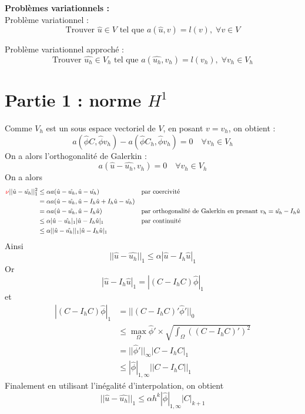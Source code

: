 \documentclass[french]{article}
\begin{document}
	\textbf{Problèmes variationnels :} \\
	
	Problème variationnel :
	$$\text{Trouver } \hat{u}\in V \text{ tel que } a(\hat{u},v)=l(v), \;\forall v\in V$$
	
	Problème variationnel approché :
	$$\text{Trouver } \hat{u_h}\in V_h \text{ tel que } a(\hat{u_h},v_h)=l(v_h), \;\forall v_h\in V_h$$
	
	\section{Partie 1 : norme $H^1$}
	
	Comme $V_h$ est un sous espace vectoriel de $V$, en posant $v=v_h$, on obtient :
	$$a(\hat{\phi}C,\hat{\phi}v_h)-a(\hat{\phi}C_h,\hat{\phi}v_h)=0 \quad \forall v_h\in V_h$$
	On a alors l'orthogonalité de Galerkin : \color{red}{(ATTENTION : Abus de notation sur $v_h$ !)}\color{black}
	$$a(\hat{u}-\hat{u_h},v_h)=0 \quad \forall v_h\in V_h$$
	On a alors
	\begin{align*}
		\color{red}{\nu}\color{black}||\hat{u}-\hat{u_h}||_1^2&\le\alpha a(\hat{u}-\hat{u_h},\hat{u}-\hat{u_h}) &&\text{par coercivité} \\
		&=\alpha a(\hat{u}-\hat{u_h},\hat{u}-I_h\hat{u}+I_h\hat{u}-\hat{u_h}) \\
		&=\alpha a(\hat{u}-\hat{u_h},\hat{u}-I_h\hat{u}) &&\text{par orthogonalité de Galerkin en prenant } v_h=\hat{u_h}-I_h\hat{u} \\
		&\le\alpha |\hat{u}-\hat{u_h}|_1|\hat{u}-I_h\hat{u}|_1 &&\text{par continuité} \\
		&\le\alpha ||\hat{u}-\hat{u_h}||_1|\hat{u}-I_h\hat{u}|_1
	\end{align*}
	Ainsi
	$$||\hat{u}-\hat{u_h}||_1\le\alpha|\hat{u}-I_h\hat{u}|_1$$
	Or 
	$$|\hat{u}-I_h\hat{u}|_1=|(C-I_hC)\hat{\phi}|_1$$
	et
	\begin{align*}
		|(C-I_hC)\hat{\phi}|_1&=||(C-I_hC)'\hat{\phi}'||_0 \\
		&\le \max_\Omega\hat{\phi}'\times\sqrt{\int_\Omega \left((C-I_hC)'\right)^2} \\
		&=||\hat{\phi}'||_\infty |C-I_hC|_1 \\
		&\le|\hat{\phi}|_{1,\infty} ||C-I_hC||_1
	\end{align*}
	Finalement en utilisant l'inégalité d'interpolation, on obtient
	\begin{equation}
		\boxed{||\hat{u}-\hat{u_h}||_1\le\alpha h^k |\hat{\phi}|_{1,\infty} |C|_{k+1}}
		\label{norme_H1}
	\end{equation} 
\end{document}
